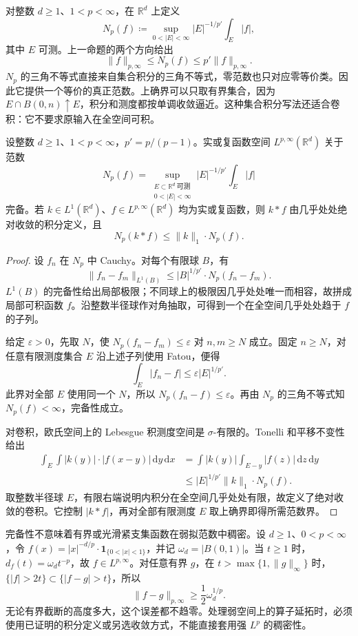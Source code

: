 \ProseParagraphBreak

对整数 \(d\geq1\)、\(1<p<\infty\)，在 \(\mathbb R^d\) 上定义
\[N_p(f)\coloneqq\sup_{0<|E|<\infty}|E|^{-1/p'}\int_E|f|,\]
其中 \(E\) 可测。上一命题的两个方向给出
\[\|f\|_{p,\infty}\leq N_p(f)\leq p'\|f\|_{p,\infty}.\]
\(N_p\) 的三角不等式直接来自集合积分的三角不等式，零范数也只对应零等价类。因此它提供一个等价的真正范数。上确界可以只取有界集合，因为 \(E\cap B(0,n)\uparrow E\)，积分和测度都按单调收敛逼近。这种集合积分写法还适合卷积：它不要求原输入在全空间可积。

\begin{proposition}[弱空间的完备性与卷积]\label{b2:prop:17-weak-complete}
设整数 \(d\geq1\)、\(1<p<\infty\)，\(p'=p/(p-1)\)。实或复函数空间 \(L^{p,\infty}(\mathbb R^d)\) 关于范数
\[N_p(f)=\sup_{\substack{E\subset\mathbb R^d\ \text{可测}\\0<|E|<\infty}}
 |E|^{-1/p'}\int_E|f|\]
完备。若 \(k\in L^1(\mathbb R^d)\)、\(f\in L^{p,\infty}(\mathbb R^d)\) 均为实或复函数，则 \(k*f\) 由几乎处处绝对收敛的积分定义，且
\[N_p(k*f)\leq\|k\|_1\cdot N_p(f).\]
\end{proposition}
\begin{proof}
设 \(f_n\) 在 \(N_p\) 中 Cauchy。对每个有限球 \(B\)，有
\[\|f_n-f_m\|_{L^1(B)}\leq |B|^{1/p'}\cdot N_p(f_n-f_m).\]
\(L^1(B)\) 的完备性给出局部极限；不同球上的极限因几乎处处唯一而相容，故拼成局部可积函数 \(f\)。沿整数半径球作对角抽取，可得到一个在全空间几乎处处趋于 \(f\) 的子列。

给定 \(\varepsilon>0\)，先取 \(N\)，使 \(N_p(f_n-f_m)\leq\varepsilon\) 对 \(n,m\geq N\) 成立。固定 \(n\geq N\)，对任意有限测度集合 \(E\) 沿上述子列使用 Fatou，便得
\[\int_E|f_n-f|\leq\varepsilon|E|^{1/p'}.\]
此界对全部 \(E\) 使用同一个 \(N\)，所以 \(N_p(f_n-f)\leq\varepsilon\)。再由 \(N_p\) 的三角不等式知 \(N_p(f)<\infty\)，完备性成立。

对卷积，欧氏空间上的 Lebesgue 积测度空间是 \(\sigma\)-有限的。Tonelli 和平移不变性给出
\[
 \begin{aligned}
 \int_E\int |k(y)|\cdot|f(x-y)|\,\mathrm dy\,\mathrm dx
 &=\int |k(y)|\int_{E-y}|f(z)|\,\mathrm dz\,\mathrm dy\\
 &\leq |E|^{1/p'}\|k\|_1\cdot N_p(f).
 \end{aligned}
\]
取整数半径球 \(E\)，有限右端说明内积分在全空间几乎处处有限，故定义了绝对收敛的卷积。它控制 \(|k*f|\)，再对全部有限测度 \(E\) 取上确界即得所需范数界。
\end{proof}
完备性不意味着有界或光滑紧支集函数在弱拟范数中稠密。设 \(d\geq1\)、\(0<p<\infty\)，令 \(f(x)=|x|^{-d/p}\cdot\mathbf1_{\{0<|x|<1\}}\)，并记 \(\omega_d=|B(0,1)|\)。当 \(t\geq1\) 时，\(d_f(t)=\omega_dt^{-p}\)，故 \(f\in L^{p,\infty}\)。对任意有界 \(g\)，在 \(t>\max\{1,\|g\|_\infty\}\) 时，\(\{|f|>2t\}\subset\{|f-g|>t\}\)，所以
\[\|f-g\|_{p,\infty}\geq\frac12\omega_d^{1/p}.\]
无论有界截断的高度多大，这个误差都不趋零。处理弱空间上的算子延拓时，必须使用已证明的积分定义或另选收敛方式，不能直接套用强 \(L^p\) 的稠密性。

